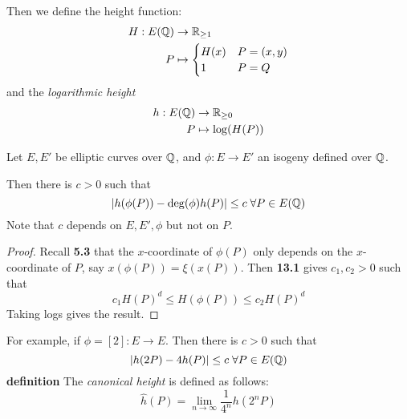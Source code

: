\documentclass[10pt,a4paper]{article}
\begin{document}
Then we define the height function:
\begin{align*}
  H:E(\mathbb{Q}) & \to \mathbb{R}_{\geq 1}\\
  P&\mapsto \begin{cases} H(x) & P = (x,y)\\ 1 & P=Q \end{cases}
\end{align*}
and the \emph{logarithmic height}
\begin{align*}
  h:E(\mathbb{Q}) & \to \mathbb{R}_{\geq 0}\\
  P&\mapsto \log(H(P))
\end{align*}
\begin{lemma}
  Let $E, E'$ be elliptic curves over $\mathbb{Q}$, and $\phi:E \to E'$ an isogeny defined over $\mathbb{Q}$.

  Then there is $c>0$ such that
  \[|h(\phi(P)) - \deg(\phi)h(P)| \leq c \forall P \in E(\Q)\]
  Note that $c$ depends on $E, E', \phi$ but not on $P$.
\end{lemma}
\begin{proof}
  Recall \textbf{5.3} that the $x$-coordinate of $\phi(P)$ only depends on the $x$-coordinate of $P$, say $x(\phi(P)) = \xi(x(P))$. Then \textbf{13.1} gives $c_1, c_2> 0$ such that
  \[c_1 H(P)^d \leq H(\phi(P)) \leq c_2 H(P)^d\]
  Taking logs gives the result.
\end{proof}
For example, if $\phi = [2]:E \to E$. Then there is $c>0$ such that
\[|h(2P) - 4h(P)| \leq c \forall P \in E(\Q)\]
\textbf{definition}
  The \emph{canonical height} is defined as follows:
  \[\hat{h}(P ) =\lim_{n\to\infty}\frac{1}{4^n}h(2^n P)\]
\end{document}
